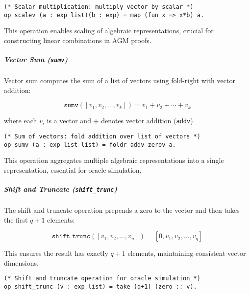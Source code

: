\begin{lstlisting}[style=easycrypt, caption=Scalar Multiplication, breaklines=true, breakatwhitespace=true, frame=single, keepspaces=true]
(* Scalar multiplication: multiply vector by scalar *)
op scalev (a : exp list)(b : exp) = map (fun x => x*b) a.
\end{lstlisting}

This operation enables scaling of algebraic representations, crucial for constructing linear combinations in AGM proofs.

\subparagraph{Vector Sum (\texttt{sumv})}

Vector sum computes the sum of a list of vectors using fold-right with vector addition:

\begin{equation}
\texttt{sumv}([v_1, v_2, \ldots, v_k]) = v_1 + v_2 + \cdots + v_k
\end{equation}

where each $v_i$ is a vector and $+$ denotes vector addition (\texttt{addv}).

\begin{lstlisting}[style=easycrypt, caption=Vector Sum, breaklines=true, breakatwhitespace=true, frame=single, keepspaces=true]
(* Sum of vectors: fold addition over list of vectors *)
op sumv (a : exp list list) = foldr addv zerov a.
\end{lstlisting}

This operation aggregates multiple algebraic representations into a single representation, essential for oracle simulation.

\subparagraph{Shift and Truncate (\texttt{shift\_trunc})}

The shift and truncate operation prepends a zero to the vector and then takes the first $q+1$ elements:

\begin{equation}
\texttt{shift\_trunc}([v_1, v_2, \ldots, v_n]) = [0, v_1, v_2, \ldots, v_q]
\end{equation}

This ensures the result has exactly $q+1$ elements, maintaining consistent vector dimensions.

\begin{lstlisting}[style=easycrypt, caption=Shift and Truncate Operation, breaklines=true, breakatwhitespace=true, frame=single, keepspaces=true]
(* Shift and truncate operation for oracle simulation *)
op shift_trunc (v : exp list) = take (q+1) (zero :: v).
\end{lstlisting}

